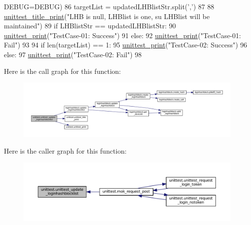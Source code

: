 \begin{DoxyCode}
      DEBUG=DEBUG)
86     targetList = updatedLHBlistStr.split(\textcolor{stringliteral}{','})
87 
88     \hyperlink{namespaceunittest_a642ec5401fe406315f1489d237ba826e}{unittest\_title\_print}(\textcolor{stringliteral}{"LHB is null, LHBlist is one, su LHBlist will be maintained"})
89     \textcolor{keywordflow}{if} LHBlistStr == updatedLHBlistStr:
90         \hyperlink{namespaceunittest_a217a1a3af5bc9748f2f6194bf79402bc}{unittest\_print}(\textcolor{stringliteral}{"TestCase-01: Success"})
91     \textcolor{keywordflow}{else}:
92         \hyperlink{namespaceunittest_a217a1a3af5bc9748f2f6194bf79402bc}{unittest\_print}(\textcolor{stringliteral}{"TestCase-01: Fail"})
93 
94     \textcolor{keywordflow}{if} len(targetList) == 1:
95         \hyperlink{namespaceunittest_a217a1a3af5bc9748f2f6194bf79402bc}{unittest\_print}(\textcolor{stringliteral}{"TestCase-02: Success"})
96     \textcolor{keywordflow}{else}:
97         \hyperlink{namespaceunittest_a217a1a3af5bc9748f2f6194bf79402bc}{unittest\_print}(\textcolor{stringliteral}{"TestCase-02: Fail"})
98 
\end{DoxyCode}


Here is the call graph for this function\+:
\nopagebreak
\begin{figure}[H]
\begin{center}
\leavevmode
\includegraphics[width=350pt]{namespaceunittest_a9e16eaba67b93461be6ea8ef6332507a_cgraph}
\end{center}
\end{figure}




Here is the caller graph for this function\+:
\nopagebreak
\begin{figure}[H]
\begin{center}
\leavevmode
\includegraphics[width=350pt]{namespaceunittest_a9e16eaba67b93461be6ea8ef6332507a_icgraph}
\end{center}
\end{figure}





